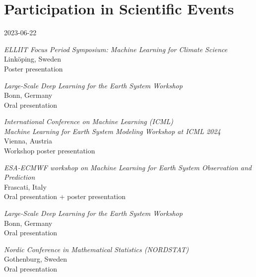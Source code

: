 \section*{Participation in Scientific Events}
\newcommand{\event}[4]{\item [#2] \textit{#1}\\ {\footnotesize#3}\\#4}
\begin{labeling}{2023-06-22}
    \event{ELLIIT Focus Period Symposium: Machine Learning for Climate Science}{2024}{Linköping, Sweden}{Poster presentation}
    \event{Large-Scale Deep Learning for the Earth System Workshop}{2024}{Bonn, Germany}{Oral presentation}
    \event{International Conference on Machine Learning (ICML)\\Machine Learning for Earth System Modeling Workshop at ICML 2024}{2024}{Vienna, Austria}{Workshop poster presentation}
    \event{ESA-ECMWF workshop on Machine Learning for Earth System Observation and Prediction}{2024}{Frascati, Italy}{Oral presentation + poster presentation}
    \event{Large-Scale Deep Learning for the Earth System Workshop}{2023}{Bonn, Germany}{Oral presentation}
    \event{Nordic Conference in Mathematical Statistics (NORDSTAT)}{2023}{Gothenburg, Sweden}{Oral presentation}
\end{labeling}
